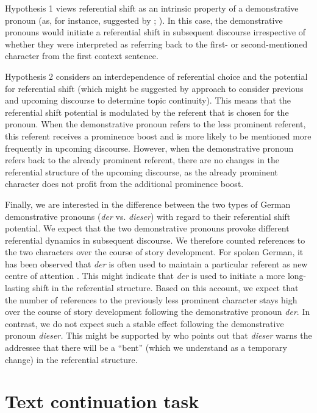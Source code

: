 \documentclass[output=paper,colorlinks,citecolor=brown]{langscibook}
\begin{document}
Hypothesis 1 views referential shift as an intrinsic property of a demonstrative pronoun (as, for instance, suggested by \citealt{Weinrich1993}; \citealt{Abraham2002}). In this case, the demonstrative pronouns would initiate a referential shift in subsequent discourse irrespective of whether they were interpreted as referring back to the first- or second-mentioned character from the first context sentence. 

Hypothesis 2 considers an interdependence of referential choice and the potential for referential shift (which might be suggested by  approach to consider previous and upcoming discourse to determine topic continuity). This means that the referential shift potential is modulated by the referent that is chosen for the pronoun. When the demonstrative pronoun refers to the less prominent referent, this referent receives a prominence boost and is more likely to be mentioned more frequently in upcoming discourse. However, when the demonstrative pronoun refers back to the already prominent referent, there are no changes in the referential structure of the upcoming discourse, as the already prominent character does not profit from the additional prominence boost. 

Finally, we are interested in the difference between the two types of German demonstrative pronouns (\textit{der} vs. \textit{dieser}) with regard to their referential shift potential. We expect that the two demonstrative pronouns provoke different referential dynamics in subsequent discourse. We therefore counted references to the two characters over the course of story development. For spoken German, it has been observed that \textit{der} is often used to maintain a particular referent as new centre of attention \citep{Ahrenholz2007}. This might indicate that \textit{der} is used to initiate a more long-lasting shift in the referential structure{. B}ased on this account, we expect that the number of references to the previously less prominent character stays high over the course of story development following the demonstrative pronoun \textit{der}. In contrast, we do not expect such a stable effect following the demonstrative pronoun \textit{dieser.} This might be supported by \citet[441]{Weinrich1993} who points out that \textit{dieser} warns the addressee that there will be a “bent” (which we understand as a temporary change) in the referential structure.

\section{Text continuation task}\label{sec:fuchs:2}
\end{document}
